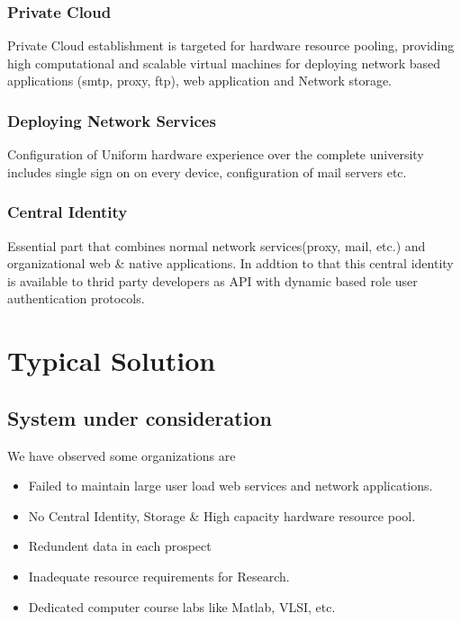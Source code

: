 \documentclass[12pt]{report}
\begin{document}
\subsection{Private Cloud}

	Private Cloud establishment is targeted for hardware resource pooling, providing high computational and scalable virtual machines for deploying network based applications (smtp, proxy, ftp), web application and Network storage.
	
\subsection{Deploying Network Services}

	Configuration of Uniform hardware experience over the complete university includes single sign on on every device, configuration of mail servers etc.
	
\subsection{Central Identity}

	Essential part that combines normal network services(proxy, mail, etc.) and organizational web \& native applications. In addtion to that this central identity is available to thrid party developers as API with dynamic based role user authentication protocols.	
	

\chapter{Typical Solution}

\section{System under consideration}

	We have observed some organizations are 
	\begin{itemize}
		\item Failed to maintain large user load web services  and network applications.
		\item No Central Identity, Storage \& High capacity hardware resource pool.
		\item Redundent data in each prospect
		\item Inadequate resource requirements for Research.
		\item Dedicated computer course labs like Matlab, VLSI, etc. 
	\end{itemize}
\end{document}
